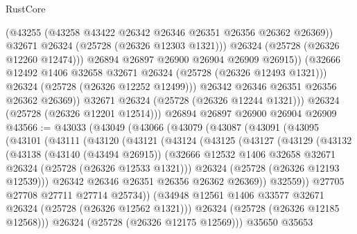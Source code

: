 \begin{lexlean}{RustCore}
\begin{coremodule}
                      (@43255 (@43258 @43422 @26342 @26346 @26351 @26356 @26362 @26369))
                      @32671
                      @26324
                      (@25728 (@26326 @12303 @1321)))
                    @26324
                    (@25728 (@26326 @12260 @12474)))
                  @26894
                  @26897
                  @26900
                  @26904
                  @26909
                  @26915))
              (@32666 @12492 @1406 @32658 @32671 @26324 (@25728 (@26326 @12493 @1321)))
              @26324
              (@25728 (@26326 @12252 @12499)))
            @26342
            @26346
            @26351
            @26356
            @26362
            @26369))
        @32671
        @26324
        (@25728 (@26326 @12244 @1321)))
      @26324
      (@25728 (@26326 @12201 @12514)))
    @26894
    @26897
    @26900
    @26904
    @26909
@43566 := @43033
    (@43049
      (@43066
        (@43079
          (@43087
            (@43091
              (@43095
                (@43101
                  (@43111
                    (@43120
                      (@43121
                        (@43124
                          (@43125
                            (@43127
                              (@43129
                                (@43132
                                  (@43138
                                    (@43140 (@43494 @26915))
                                    (@32666
                                      @12532
                                      @1406
                                      @32658
                                      @32671
                                      @26324
                                      (@25728 (@26326 @12533 @1321)))
                                    @26324
                                    (@25728 (@26326 @12193 @12539)))
                                  @26342
                                  @26346
                                  @26351
                                  @26356
                                  @26362
                                  @26369))
                              @32559))
                          @27705
                          @27708
                          @27711
                          @27714
                          @25734))
                      (@34948 @12561 @1406 @33577 @32671 @26324 (@25728 (@26326 @12562 @1321)))
                      @26324
                      (@25728 (@26326 @12185 @12568)))
                    @26324
                    (@25728 (@26326 @12175 @12569)))
                  @35650
                  @35653

\end{coremodule}
\end{lexlean}
